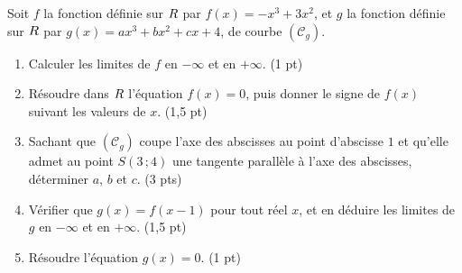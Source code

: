 \begin{devoir}[2 heures]
Soit $f$ la fonction définie sur $R$ par $f(x) = -x^{3}+3x^{2}$, et $g$ la
fonction définie sur $R$ par $g(x) = ax^{3}+bx^{2}+cx+4$, de courbe
$(\mathcal C_{g})$.
\begin{enumerate}[label=\textbf{\arabic*.}, leftmargin=*, itemsep=0.2em]
  \item Calculer les limites de $f$ en $-\infty$ et en $+\infty$.
        \hfill\textup{(1 pt)}
  \item Résoudre dans $R$ l'équation $f(x) = 0$, puis donner le signe de
        $f(x)$ suivant les valeurs de $x$. \hfill\textup{(1,5 pt)}
  \item Sachant que $(\mathcal C_{g})$ coupe l'axe des abscisses au point
        d'abscisse $1$ et qu'elle admet au point $S(3\,;4)$ une tangente
        parallèle à l'axe des abscisses, déterminer $a$, $b$ et $c$.
        \hfill\textup{(3 pts)}
  \item Vérifier que $g(x) = f(x-1)$ pour tout réel $x$, et en déduire les
        limites de $g$ en $-\infty$ et en $+\infty$. \hfill\textup{(1,5 pt)}
  \item Résoudre l'équation $g(x) = 0$. \hfill\textup{(1 pt)}
\end{enumerate}
\end{devoir}

